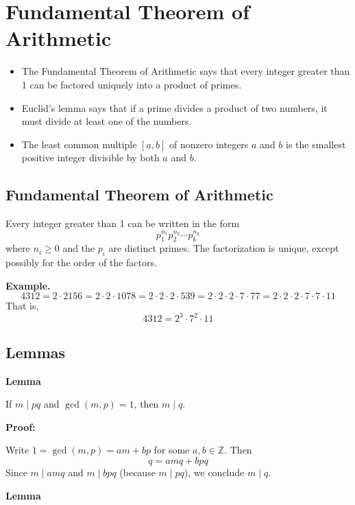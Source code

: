 \newpage
\section{Fundamental Theorem of Arithmetic}

\begin{itemize}[label=\(-\)]
	\item The Fundamental Theorem of Arithmetic says that every integer greater than 1 can be factored uniquely into a product of primes.
	\item Euclid’s lemma says that if a prime divides a product of two numbers, it must divide at least one of the numbers.
	\item The least common multiple \([a, b]\) of nonzero integers \(a\) and \(b\) is the smallest positive integer divisible by both \(a\) and \(b\).
\end{itemize}

\subsection{Fundamental Theorem of Arithmetic}

Every integer greater than 1 can be written in the form
\[
	p_1^{n_1}p_2^{n_2} \cdots p_k^{n_k}
\]
where \(n_i \geq 0\) and the \(p_i\) are distinct primes. The factorization is unique, except possibly for the order of the factors.
\vspace{\baselineskip}

\textbf{Example.}
\[
	4312 = 2 \cdot 2156 = 2 \cdot 2 \cdot 1078 = 2 \cdot 2 \cdot 2 \cdot 539 = 2 \cdot 2 \cdot 2 \cdot 7 \cdot 77 = 2 \cdot 2 \cdot 2 \cdot 7 \cdot 7 \cdot 11
\]
That is,
\[
	4312 = 2^3 \cdot 7^2 \cdot 11
\]

\subsection{Lemmas}

\textbf{Lemma} 

If \(m \mid pq\) and \(\gcd(m, p) = 1\), then \(m \mid q\).
\vspace{\baselineskip}

\textbf{Proof:} 

Write \(1 = \gcd(m, p) = am + bp\) for some \(a, b \in \mathbb{Z}\).
Then
\[
	q = amq + bpq
\]
Since \(m \mid amq\) and \(m \mid bpq\) (because \(m \mid pq\)), we conclude \(m \mid q\).

\QED


\textbf{Lemma} 


